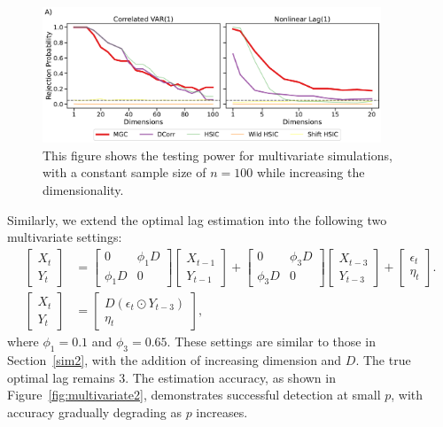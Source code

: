\begin{figure}
    \centering
    \includegraphics[width=0.9\textwidth]{figures/mgcx/multivariate_power.pdf}
    \caption{This figure shows the testing power for multivariate simulations, with a constant sample size of $n=100$ while increasing the dimensionality.
    } \label{fig:multivariate1}
\end{figure}

Similarly, we extend the optimal lag estimation into the following two multivariate settings: 
\begin{align*}
    \begin{bmatrix}
    X_t\\
    Y_t
    \end{bmatrix}
    &=
    \begin{bmatrix}
    0 & \phi_1 D\\
    \phi_1 D & 0
    \end{bmatrix}
    \begin{bmatrix}
    X_{t-1}\\
    Y_{t-1}
    \end{bmatrix}
    + 
    \begin{bmatrix}
    0 & \phi_3 D\\
    \phi_3 D & 0
    \end{bmatrix}
    \begin{bmatrix}
    X_{t-3}\\
    Y_{t-3}
    \end{bmatrix}
    +
    \begin{bmatrix}
    \epsilon_t\\
    \eta_t
    \end{bmatrix}.\\
    \begin{bmatrix}
    X_t\\
    Y_t
    \end{bmatrix}
    &=
    \begin{bmatrix}
    D (\epsilon_t \odot Y_{t-3})\\
    \eta_t
    \end{bmatrix},
\end{align*}
where $\phi_1 = 0.1$ and $\phi_3= 0.65$. These settings are similar to those in Section~\ref{sim2}, with the addition of increasing dimension and $D$. The true optimal lag remains $3$. The estimation accuracy, as shown in Figure~\ref{fig:multivariate2}, demonstrates successful detection at small $p$, with accuracy gradually degrading as $p$ increases.

